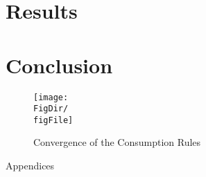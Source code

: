 \documentclass[titlepage]{\econtex}\providecommand{\texname}{BufferStockTheory}
\providecommand{\FigDir}{Figures}
\providecommand{\TableDir}{Tables}
\begin{document}
\section{Results}


\hypertarget{Conclusion}{}
\section{Conclusion}







\providecommand{\figName}{Convergence-of-the-Consumption-Rules}
\providecommand{\figFile}{cFuncsConverge}
\hypertarget{\figFile}{}
\hypertarget{\figName}{}
\begin{figure}[tbp]
\centerline{\texttt{[image: \\FigDir/\\figFile]}}
\caption{Convergence of the Consumption Rules}
\label{fig:\figFile}
\end{figure}














\clearpage\vfill\eject

\appendix

\centerline{\LARGE Appendices}\vspace{0.2in}




\clearpage\vfill\eject

\normalsize



\end{document}
